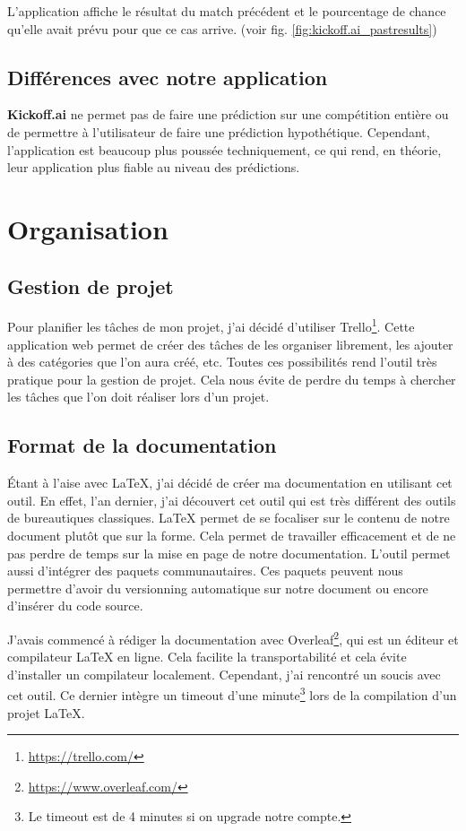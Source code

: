 \documentclass[a4paper,14pt]{extarticle}
\begin{document}
{L'application affiche le résultat du match précédent et le pourcentage de chance qu'elle avait prévu pour que ce cas arrive. (voir fig. \ref{fig:kickoff.ai_pastresults})

\subsection{Différences avec notre application}

\textbf{Kickoff.ai} ne permet pas de faire une prédiction sur une compétition entière ou de permettre à l'utilisateur de faire une prédiction hypothétique. Cependant, l'application est beaucoup plus poussée techniquement, ce qui rend, en théorie, leur application plus fiable au niveau des prédictions.

\section{Organisation}

\subsection{Gestion de projet}

Pour planifier les tâches de mon projet, j'ai décidé d'utiliser Trello\footnote{\url{https://trello.com/}}. Cette application web permet de créer des tâches de les organiser librement, les ajouter à des catégories que l'on aura créé, etc. Toutes ces possibilités rend l'outil très pratique pour la gestion de projet. Cela nous évite de perdre du temps à chercher les tâches que l'on doit réaliser lors d'un projet. 

\subsection{Format de la documentation}

Étant à l'aise avec \LaTeX, j'ai décidé de créer ma documentation en utilisant cet outil. En effet, l'an dernier, j'ai découvert cet outil qui est très différent des outils de bureautiques classiques. \LaTeX{} permet de se focaliser sur le contenu de notre document plutôt que sur la forme. Cela permet de travailler efficacement et de ne pas perdre de temps sur la mise en page de notre documentation. L'outil permet aussi d'intégrer des paquets communautaires. Ces paquets peuvent nous permettre d'avoir du versionning automatique sur notre document ou encore d'insérer du code source. 

J'avais commencé à rédiger la documentation avec Overleaf\footnote{\url{https://www.overleaf.com/}}, qui est un éditeur et compilateur \LaTeX{} en ligne. Cela facilite la transportabilité et cela évite d'installer un compilateur localement. Cependant, j'ai rencontré un soucis avec cet outil. Ce dernier intègre un timeout d'une minute\footnote{Le timeout est de 4 minutes si on upgrade notre compte.} lors de la compilation d'un projet \LaTeX{}. 

}
\end{document}
